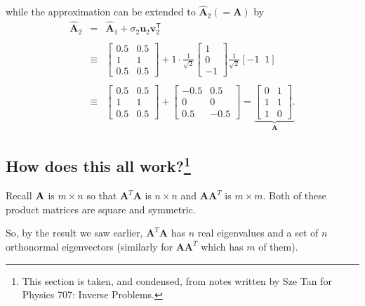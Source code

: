 while the approximation can be extended to  $\widehat {\mathbf A}_2 (= \mathbf A)$ by
\[
\begin{array}{lll}
\widehat{\mathbf{A}}_2 & = & \widehat{\mathbf{A}}_1 + \sigma_2\mathbf{u}_2\mathbf{v}_2^\mathsf{T}\\\\
& \equiv & \left[ \begin{array}{ll}0.5 & 0.5\\ 1 & 1 \\ 0.5 & 0.5\end{array} \right] + 
1\cdot\frac{1}{\sqrt{2}}\left[ \begin{array}{r}1\\ 0\\ -1 \end{array}\right]  \frac{1}{\sqrt{2}}\left[ -1\;\;1 \right] \\ \\
&\equiv & \left[ \begin{array}{ll}0.5 & 0.5\\ 1 & 1 \\ 0.5 & 0.5\end{array} \right] + 
\left[ \begin{array}{rr}-0.5 & 0.5\\ 0 & 0 \\ 0.5 & -0.5\end{array} \right]  = 
\underbrace{ \left[ \begin{array}{rr}0 & 1\\ 1 & 1 \\ 1 & 0\end{array} \right].  }_{\mathbf{A}}
\end{array}
\]

\subsection{How does this all work?\footnote{This section is taken, and condensed, from notes  written by Sze Tan for Physics 707: Inverse Problems.   }} \label{sec:svdexplain}

Recall $\bf A$ is $m\times n$ so that $\mathbf A^T \mathbf A$ is $n\times n$ and $\mathbf {AA}^T$ is $m \times m$.  Both of these product  matrices are square and symmetric.

So, by the result we saw earlier,  $\mathbf A^T\mathbf A$ has $n$ real eigenvalues and a set of $n$ orthonormal eigenvectors (similarly for $\mathbf {AA}^T$ which has $m$ of them).

